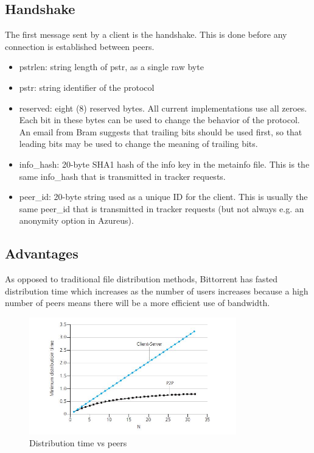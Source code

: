 \documentclass[letter]{scrartcl}
\begin{document}
\subsection{Handshake}
The first message sent by a client is the handshake.  This is done before any connection is established between peers. 
\begin{itemize}
\item pstrlen: string length of pstr, as a single raw byte
\item pstr: string identifier of the protocol
\item reserved: eight (8) reserved bytes. All current implementations use all zeroes. Each bit in these bytes can be used to change the behavior of the protocol. An email from Bram suggests that trailing bits should be used first, so that leading bits may be used to change the meaning of trailing bits.
\item info\_hash: 20-byte SHA1 hash of the info key in the metainfo file. This is the same info\_hash that is transmitted in tracker requests.
\item peer\_id: 20-byte string used as a unique ID for the client. This is usually the same peer\_id that is transmitted in tracker requests (but not always e.g. an anonymity option in Azureus).
\end{itemize}
\subsection{Advantages}

As opposed to traditional file distribution methods, Bittorrent has fasted distribution time which increases as the number of users increases because a high number of peers means there  will be a more efficient use of bandwidth. 

\begin{figure}[ht!]
\centering
\includegraphics[width=90mm]{Graph.jpg}
\caption{Distribution time vs peers}
\label{overflow}
\end{figure}
\end{document}
